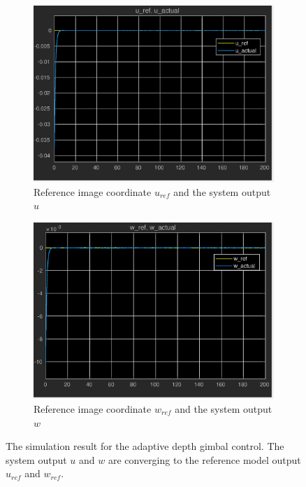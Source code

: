 \begin{figure}[htbp]
	\centering
	\begin{subfigure}{0.5\textwidth}
		\centering
		\includegraphics[width=0.9\linewidth]{images/chapter2/u_adaptive}
		\caption{Reference image coordinate $u_{ref}$ and the system output $u$}
	\end{subfigure}%
	\begin{subfigure}{0.5\textwidth}
		\centering
		\includegraphics[width=0.9\linewidth]{images/chapter2/w_adaptive}
		\caption{Reference image coordinate $w_{ref}$ and the system output $w$}
	\end{subfigure}
	\caption{The simulation result for the adaptive depth gimbal control. The system output $u$ and $w$ are converging to the reference model output $u_{ref}$ and $w_{ref}$.}
	\label{adaptive_result}
\end{figure}

